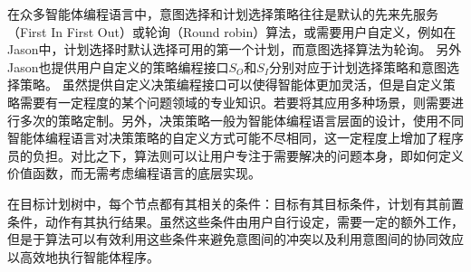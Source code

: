 %
在众多智能体编程语言中，意图选择和计划选择策略往往是默认的先来先服务（First In First Out）或轮询（Round robin）算法，或需要用户自定义，例如在Jason\cite{bordini2007programming}中，计划选择时默认选择可用的第一个计划，而意图选择算法为轮询。
%
另外Jason也提供用户自定义的策略编程接口$S_O$和$S_I$分别对应于计划选择策略和意图选择策略。
虽然提供自定义决策编程接口可以使得智能体更加灵活，但是自定义策略需要有一定程度的某个问题领域的专业知识。若要将其应用多种场景，则需要进行多次的策略定制。另外，决策策略一般为智能体编程语言层面的设计，使用不同智能体编程语言对决策策略的自定义方式可能不尽相同，这一定程度上增加了程序员的负担。对比之下，\SA 算法则可以让用户专注于需要解决的问题本身，即如何定义价值函数，而无需考虑编程语言的底层实现。

%
在目标计划树中，每个节点都有其相关的条件：目标有其目标条件，计划有其前置条件，动作有其执行结果。虽然这些条件由用户自行设定，需要一定的额外工作，但是于\SA 算法可以有效利用这些条件来避免意图间的冲突以及利用意图间的协同效应以高效地执行智能体程序。
